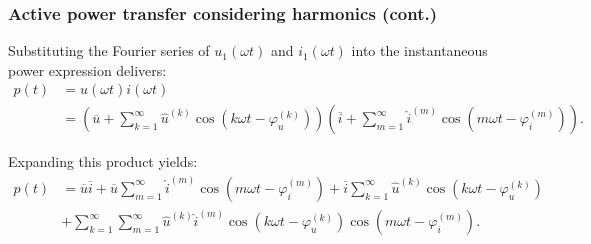 \begin{frame}
	\frametitle{Active power transfer considering harmonics (cont.)}
	Substituting the Fourier series of \(u_1(\omega t)\) and \(i_1(\omega t)\) into the instantaneous power expression delivers:
	\begin{align*}
		p(t) & = u(\omega t) i(\omega t)                                                                         \\
		     & = \left( \overline{u} + \sum_{k=1}^\infty \hat{u}^{(k)} \cos(k\omega t - \varphi_u^{(k)}) \right)
		\left( \overline{i} + \sum_{m=1}^\infty \hat{i}^{(m)} \cos(m\omega t - \varphi_i^{(m)}) \right).
	\end{align*}\pause

	Expanding this product yields:
	\begin{align*}
		p(t) & = \overline{u} \overline{i}
		+ \overline{u} \sum_{m=1}^\infty \hat{i}^{(m)} \cos(m\omega t - \varphi_i^{(m)})
		+ \overline{i} \sum_{k=1}^\infty \hat{u}^{(k)} \cos(k\omega t - \varphi_u^{(k)}) \\
		     & + \sum_{k=1}^\infty \sum_{m=1}^\infty \hat{u}^{(k)} \hat{i}^{(m)}
		\cos(k\omega t - \varphi_u^{(k)}) \cos(m\omega t - \varphi_i^{(m)}).
	\end{align*}

\end{frame}

